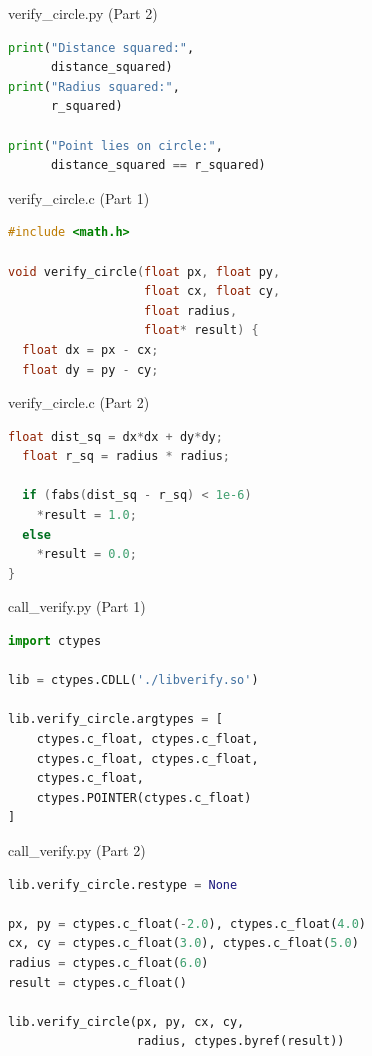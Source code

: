 \documentclass{beamer}
\begin{document}
\begin{frame}[fragile]{verify\_circle.py (Part 2)}
\begin{lstlisting}[language=Python]
print("Distance squared:",
      distance_squared)
print("Radius squared:",
      r_squared)

print("Point lies on circle:",
      distance_squared == r_squared)
\end{lstlisting}
\end{frame}

\begin{frame}[fragile]{verify\_circle.c (Part 1)}
\begin{lstlisting}[language=C]
#include <math.h>

void verify_circle(float px, float py,
                   float cx, float cy,
                   float radius,
                   float* result) {
  float dx = px - cx;
  float dy = py - cy;
\end{lstlisting}
\end{frame}

\begin{frame}[fragile]{verify\_circle.c (Part 2)}
\begin{lstlisting}[language=C]
  float dist_sq = dx*dx + dy*dy;
  float r_sq = radius * radius;

  if (fabs(dist_sq - r_sq) < 1e-6)
    *result = 1.0;
  else
    *result = 0.0;
}
\end{lstlisting}
\end{frame}

\begin{frame}[fragile]{call\_verify.py (Part 1)}
\begin{lstlisting}[language=Python]
import ctypes

lib = ctypes.CDLL('./libverify.so')

lib.verify_circle.argtypes = [
    ctypes.c_float, ctypes.c_float,
    ctypes.c_float, ctypes.c_float,
    ctypes.c_float,
    ctypes.POINTER(ctypes.c_float)
]
\end{lstlisting}
\end{frame}

\begin{frame}[fragile]{call\_verify.py (Part 2)}
\begin{lstlisting}[language=Python]
lib.verify_circle.restype = None

px, py = ctypes.c_float(-2.0), ctypes.c_float(4.0)
cx, cy = ctypes.c_float(3.0), ctypes.c_float(5.0)
radius = ctypes.c_float(6.0)
result = ctypes.c_float()

lib.verify_circle(px, py, cx, cy,
                  radius, ctypes.byref(result))
\end{lstlisting}
\end{frame}
\end{document}
